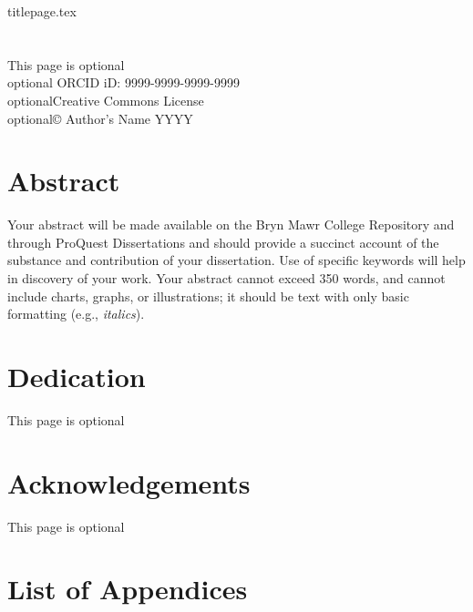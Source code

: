 \documentclass[12pt]{report}
\makeatletter
\newcommand\listappendixname{List of Appendices}
\newcommand\listofappendices{%
  \chapter*{\listappendixname}\@starttoc{app}}
\makeatother
\begin{document}
{titlepage.tex} %
\chapter*{}
\vspace*{\fill}
\begin{center}
\begin{singlespace}
This page is optional\\

optional ORCID iD:  9999-9999-9999-9999\\
optionalCreative Commons License \\
optional© Author's Name YYYY\\
\end{singlespace}
\end{center}
\vspace*{\fill}
\chapter*{Abstract}
\indent \indent Your abstract will be made available on the Bryn Mawr College Repository and
through ProQuest Dissertations and should provide a succinct account of the substance
and contribution of your dissertation. Use of specific keywords will help in discovery of
your work. Your abstract cannot exceed 350 words, and cannot include charts, graphs, or
illustrations; it should be text with only basic formatting (e.g., \textit{italics}).
\setcounter{page}{2}
\chapter*{Dedication}
\begin{center}
    This page is optional
\end{center}
\chapter*{Acknowledgements}
\begin{center}
    This page is optional
\end{center}
\tableofcontents
\newpage
\listoffigures
\newpage
\listoftables
\newpage
\listofappendices
\newpage
{}
\end{document}
